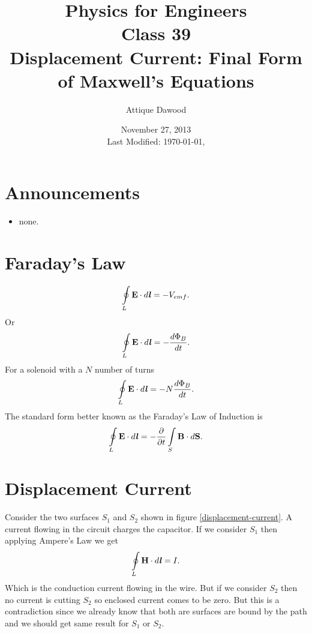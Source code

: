 \documentclass[12pt,a4paper]{article}
\title{\vspace{-3cm}Physics for Engineers\\Class 39\\Displacement Current: Final Form of Maxwell's Equations}
\author{Attique Dawood}
\date{November 27, 2013\\[0.2cm] Last Modified: \today, \currenttime}
\begin{document}
\maketitle
\section{Announcements}
\begin{itemize}
\item none.
\end{itemize}
\section{Faraday's Law}
\begin{equation}
\oint\limits_{L} \textbf{E}\cdot d\textbf{\textit{l}}=-V_{emf}.
\end{equation}
Or
\begin{equation}
\oint\limits_{L} \textbf{E}\cdot d\textbf{\textit{l}}=-\dfrac{d\Phi_B}{dt}.
\end{equation}
For a solenoid with a $N$ number of turns
\begin{equation}
\oint\limits_{L} \textbf{E}\cdot d\textbf{\textit{l}}=-N\dfrac{d\Phi_B}{dt}.
\end{equation}
The standard form better known as the Faraday's Law of Induction is
\begin{equation}
\oint\limits_{L} \textbf{E}\cdot d\textbf{\textit{l}}=-\dfrac{\partial}{\partial t}\int\limits_{S}\textbf{B}\cdot d\textbf{S}.
\end{equation}
\section{Displacement Current}
Consider the two surfaces $S_1$ and $S_2$ shown in figure \ref{displacement-current}. A current flowing in the circuit charges the capacitor. If we consider $S_1$ then applying Ampere's Law we get
\begin{equation}
\oint\limits_{L} \textbf{H}\cdot d\textbf{\textit{l}}=I.
\end{equation}
Which is the conduction current flowing in the wire. But if we consider $S_2$ then no current is cutting $S_2$ so enclosed current comes to be zero. But this is a contradiction since we already know that both are surfaces are bound by the path and we should get same result for $S_1$ or $S_2$.
\end{document}
